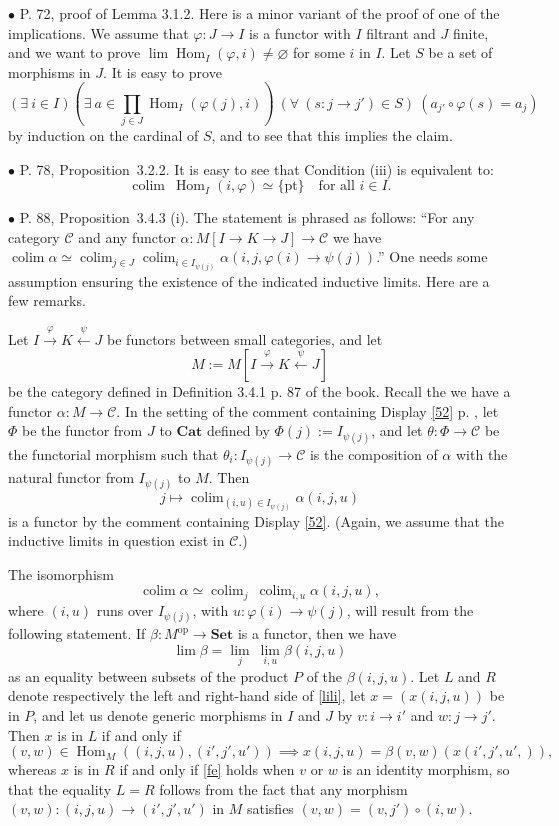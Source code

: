 \documentclass[12pt]{article}
\newcommand{\bu}{\bullet}
\newcommand{\n}{\noindent}
\newcommand{\C}{\mathcal C}
\newcommand{\Set}{\textbf{Set}}
\newcommand{\Cat}{\textbf{Cat}}
\newcommand{\op}{\text{op}}
\newcommand{\p}{\varphi}
\newcommand{\pt}{\{\text{pt}\}}
\newcommand{\be}{\begin{equation}}
\newcommand{\ee}{\end{equation}}
\newcommand{\pr}{Proposition}
\DeclareMathOperator*{\co}{colim}
\DeclareMathOperator{\h}{Hom}
\begin{document}

\n$\bu$ P. 72, proof of Lemma 3.1.2. Here is a minor variant of the proof of one of the implications. We assume that $\p:J\to I$ is a functor with $I$ filtrant and $J$ finite, and we want to prove $\lim\h_I(\p,i)\neq\varnothing$ for some $i$ in $I$. Let $S$ be a set of morphisms in $J$. It is easy to prove 
$$
(\exists\ i\in I)\left(\exists\ a\in\prod_{j\in J}\h_I(\p(j),i)\right)\ (\forall\ (s:j\to j')\in S)\ (a_{j'}\circ\p(s)=a_j) 
$$ 
by induction on the cardinal of $S$, and to see that this implies the claim. 


\n$\bu$ P. 78, \pr\ 3.2.2. It is easy to see that Condition (iii) is equivalent to: 
%
\begin{equation}\label{78} 
\co\ \h_I(i,\p)\simeq\pt\quad\text{for all }i\in I.
\end{equation} 


\n$\bu$ P. 88, \pr\ 3.4.3 (i). The statement is phrased as follows: ``For any category $\C$ and any functor $\alpha:M[I\to K\rightarrow J]\to\C$ we have $\co\alpha\simeq\co_{j\in J}\co_{i\in I_{\psi(j)}}\alpha(i,j,\p(i)\to\psi(j))$.'' One needs some assumption ensuring the existence of the indicated inductive limits. Here are a few remarks. 

Let $I\xrightarrow\p K\xleftarrow\psi J$ be functors between small categories, and let 
% 
\be\label{lalb} 
M:=M[I\xrightarrow\p K\xleftarrow\psi J] 
\ee 
% 
be the category defined in Definition 3.4.1 p. 87 of the book. Recall the we have a functor $\alpha:M\to\C$. In the setting of the comment containing Display \eqref{52} p. \pageref{52}, let $\Phi$ be the functor from $J$ to $\Cat$ defined by $\Phi(j):=I_{\psi(j)}$, and let $\theta:\Phi\to\C$ be the functorial morphism such that $\theta_i:I_{\psi(j)}\to\C$ is the composition of $\alpha$ with the natural functor from $I_{\psi(j)}$ to $M$. Then 
$$
j\mapsto\co_{(i,u)\in I_{\psi(j)}}\alpha(i,j,u) 
$$ 
is a functor by the comment containing Display \eqref{52}. (Again, we assume that the inductive limits in question exist in $\C$.) 

The isomorphism  
$$  
\co\alpha\simeq\co_j\ \co_{i,u}\alpha(i,j,u), 
$$ 
where $(i,u)$ runs over $I_{\psi(j)}$, with $u:\p(i)\to\psi(j)$, will result from the following statement. If $\beta:M^\op\to\Set$ is a functor, then we have 
%
\be\label{lili} 
\lim\beta=\lim_j\ \lim_{i,u}\beta(i,j,u) 
\ee 
% 
as an equality between subsets of the product $P$ of the $\beta(i,j,u)$. Let $L$ and $R$ denote respectively the left and right-hand side of \eqref{lili}, let $x=(x(i,j,u))$ be in $P$, and let us denote generic morphisms in $I$ and $J$ by $v:i\to i'$ and $w:j\to j'$. Then $x$ is in $L$ if and only if 
% 
\be\label{fe} 
(v,w)\in\h_M((i,j,u),(i',j',u'))\implies x(i,j,u)=\beta(v,w)(x(i',j',u',)), 
\ee 
% 
whereas $x$ is in $R$ if and only if \eqref{fe} holds when $v$ or $w$ is an identity morphism, so that the equality $L=R$ follows from the fact that any morphism $(v,w):(i,j,u)\to(i',j',u')$ in $M$ satisfies $(v,w)=(v,j')\circ(i,w)$. 
\end{document}
